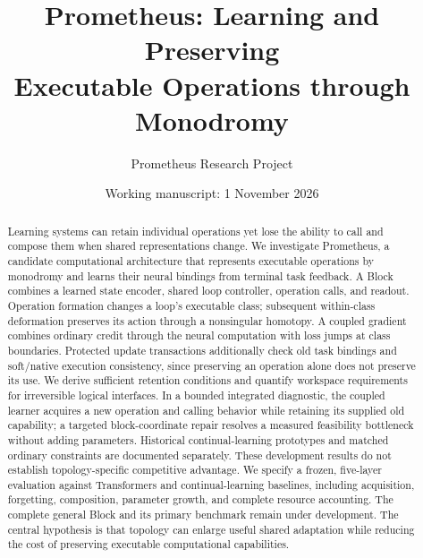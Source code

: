 \documentclass[10pt]{article}
\title{Prometheus: Learning and Preserving\\Executable Operations through Monodromy}
\author{Prometheus Research Project}
\date{Working manuscript: 1 November 2026}
\begin{document}
\maketitle
\begin{abstract}
Learning systems can retain individual operations yet lose the ability to call
and compose them when shared representations change. We investigate Prometheus,
a candidate computational architecture that represents executable operations by
monodromy and learns their neural bindings from terminal task feedback. A Block
combines a learned state encoder, shared loop controller, operation calls, and
readout. Operation formation changes a loop's executable class; subsequent
within-class deformation preserves its action through a nonsingular homotopy.
A coupled gradient combines ordinary credit through the neural computation with
loss jumps at class boundaries. Protected update transactions additionally check
old task bindings and soft/native execution consistency, since preserving an
operation alone does not preserve its use. We derive sufficient retention
conditions and quantify workspace requirements for irreversible logical
interfaces. In a bounded integrated diagnostic, the coupled learner acquires a
new operation and calling behavior while retaining its supplied old capability;
a targeted block-coordinate repair resolves a measured feasibility bottleneck
without adding parameters. Historical continual-learning prototypes and matched
ordinary constraints are documented separately. These development results do
not establish topology-specific competitive advantage. We specify a frozen,
five-layer evaluation against Transformers and continual-learning baselines,
including acquisition, forgetting, composition, parameter growth, and complete
resource accounting. The complete general Block and its primary benchmark
remain under development. The central hypothesis is that topology can enlarge
useful shared adaptation while reducing the cost of preserving executable
computational capabilities.
\end{abstract}









\clearpage


\clearpage
\appendix

\end{document}
